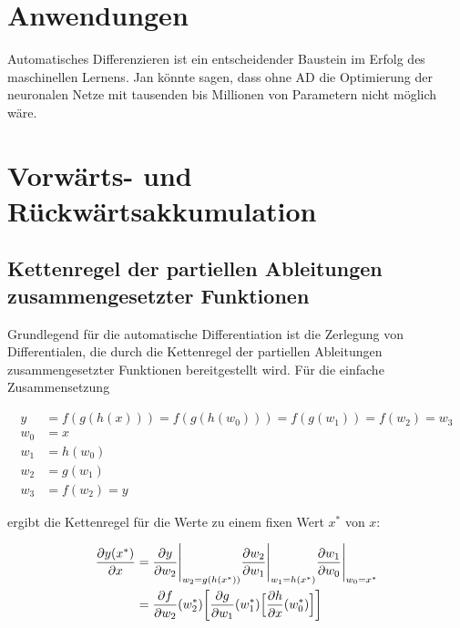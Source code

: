 \documentclass[
]{book}
\theoremstyle{definition}
\theoremstyle{definition}
\theoremstyle{definition}
\theoremstyle{definition}
\theoremstyle{remark}
\begin{document}
\hypertarget{anwendungen}{%
\section{Anwendungen}\label{anwendungen}}

Automatisches Differenzieren ist ein entscheidender Baustein im Erfolg des
maschinellen Lernens. Jan könnte sagen, dass ohne AD die Optimierung der
neuronalen Netze mit tausenden bis Millionen von Parametern nicht möglich
wäre.

\hypertarget{vorwuxe4rts--und-ruxfcckwuxe4rtsakkumulation}{%
\section{Vorwärts- und Rückwärtsakkumulation}\label{vorwuxe4rts--und-ruxfcckwuxe4rtsakkumulation}}

\hypertarget{kettenregel-der-partiellen-ableitungen-zusammengesetzter-funktionen}{%
\subsection{Kettenregel der partiellen Ableitungen zusammengesetzter Funktionen}\label{kettenregel-der-partiellen-ableitungen-zusammengesetzter-funktionen}}

Grundlegend für die automatische Differentiation ist die Zerlegung von
Differentialen, die durch die Kettenregel der partiellen Ableitungen
zusammengesetzter Funktionen bereitgestellt wird. Für die einfache
Zusammensetzung

\begin{align*}
y &= f(g(h(x))) = f(g(h(w_0))) = f(g(w_1)) = f(w_2) = w_3 \\
w_0 &= x \\ 
w_1 &= h(w_0) \\
w_2 &= g(w_1) \\
w_3 &= f(w_2) = y
\end{align*}

ergibt die Kettenregel für die Werte zu einem fixen Wert \(x^*\) von \(x\):

\begin{equation}\label{eq:eqn-chainrule-fgh}
\begin{split}
\frac{\partial y(x^*)}{\partial x} &= 
\frac{\partial y}{\partial w_2}\Biggl|_{w_2=g(h(x^*))} \frac{\partial w_2}{\partial w_1} \Biggl|_{w_1=h(x^*)}\frac{\partial w_1}{\partial w_0}\Biggl|_{w_0=x^*} \\
&= \frac{\partial f}{\partial w_2}(w_2^*)\biggl[ \frac{\partial g}{\partial w_1}(w_1^*) \Bigl[\frac{\partial h}{\partial x}(w_0^*) \Bigr] \biggr]
\end{split}
\end{equation}
\end{document}
